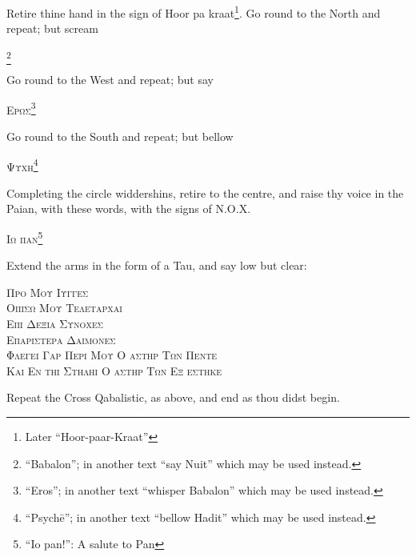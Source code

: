Retire thine hand in the sign of Hoor pa kraat\footnote{Later \enquote{Hoor-paar-Kraat}}. Go round to the North and repeat; but scream \begin{quoting}[indentfirst=false]\textsc{\GreekBabalon}\footnote{\enquote{Babalon}; in another text \enquote{say Nuit} which may be used instead.} \end{quoting}

Go round to the West and repeat; but say \begin{quoting}[indentfirst=false]\textsc{Ερωσ}\footnote{\enquote{Eros}; in another text \enquote{whisper Babalon} which may be used instead.} \end{quoting}

Go round to the South and repeat; but bellow \begin{quoting}[indentfirst=false]\textsc{Ψυχη}\footnote{\enquote{Psych\=e}; in another text \enquote{bellow Hadit} which may be used instead.} \end{quoting}

Completing the circle widdershins, retire to the centre, and raise thy voice in the Paian, with these words, with the signs of N.O.X. \begin{quoting}[indentfirst=false]\textsc{Ιω παν}\footnote{\enquote{Io pan!}: A salute to Pan}\end{quoting}

Extend the arms in the form of a Tau, and say low but clear:

\begin{quoting}[indentfirst=false]
\textsc{Προ Μου Ιυγγεσ} \\
\textsc{Οπισω Μου Τελεταρχαι} \\
\textsc{Επι Δεξια Συνοχεσ} \\
\textsc{Επαριστερα Δαιμονεσ} \\
\textsc{Φλεγει Γαρ Περι Μου Ο αστηρ Των Πεντε} \\
\textsc{Και Εν τηι Στηληι Ο αστηρ Των Εξ εστηκε}\footnotemark
\end{quoting}

Repeat the Cross Qabalistic, as above, and end as thou didst begin.
